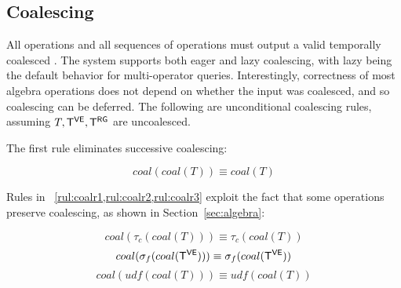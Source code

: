 \subsection{Coalescing}
\label{sec:sys:coal}



All operations and all sequences of operations must output a valid
temporally coalesced \tg.  The \ql system supports both eager and lazy
coalescing, with lazy being the default behavior for multi-operator
queries.  Interestingly, correctness of most \tg algebra operations
does not depend on whether the input was coalesced, and so coalescing
can be deferred.  The following are unconditional coalescing rules,
assuming $T, \mathsf{T^{VE}}, \mathsf{T^{RG}}$ are uncoalesced.

The first rule eliminates successive coalescing:

\begin{equation}
coal(coal(T)) \equiv coal(T)
\label{rul:coalr0}
\end{equation}

Rules in ~\cref{rul:coalr1,rul:coalr2,rul:coalr3} exploit the
fact that some operations preserve coalescing, as shown in
Section~\ref{sec:algebra}:

\begin{equation}
coal(\tau_c(coal(T))) \equiv \tau_c(coal(T))
\label{rul:coalr1}
\end{equation}
\begin{equation}
coal(\sigma_f(coal(\mathsf{T^{VE}}))) \equiv \sigma_f(coal(\mathsf{T^{VE}}))
\label{rul:coalr2}
\end{equation}
\begin{equation}
coal(udf(coal(T))) \equiv udf(coal(T))
\label{rul:coalr3}
\end{equation}

